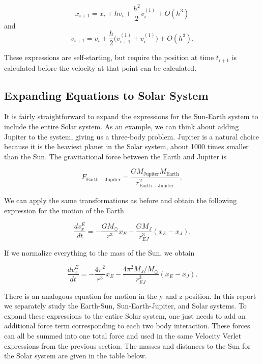 \documentclass[%
oneside,                 %
final,                   %
10pt]{article}
\begin{document}
\[
x_{i+1} =x_i +hv_i+\frac{h^2}{2}v_i^{(1)}+O(h^3)
\]
and
\[
v_{i+1} =v_i +\frac{h}{2} \big(v_{i+1}^{(1)}+v_i^{(1)} \big)+O(h^3).
\]

These expressions are self-starting, but require the position at time $t_{i+1}$ is calculated before the velocity at that point can be calculated.

\subsection{Expanding Equations to Solar System}

It is fairly straightforward to expand the expressions for the Sun-Earth system to include the entire Solar system.  As an example, we can think about adding Jupiter to the system, giving us a three-body problem.  Jupiter is a natural choice because it is the heaviest planet in the Solar system, about 1000 times smaller than the Sun.  The gravitational force between the Earth and Jupiter is

\[
F_{\mathrm{Earth-Jupiter}}=\frac{GM_{\mathrm{Jupiter}}M_{\mathrm{Earth}}}{r_{\mathrm{Earth-Jupiter}}^2},
\]

We can apply the same transformations as before and obtain the following expression for the motion of the Earth

\[
\frac{dv_x^E}{dt}=-\frac{G M_{\odot}}{r^3}x_E - \frac{G M_{J}}{r^3_{EJ}}(x_E-x_J).
\]

If we normalize everything to the mass of the Sun, we obtain

\[
\frac{dv_x^E}{dt}=-\frac{4 \pi^2}{r^3}x_E - \frac{4 \pi^2 M_J/M_{\odot}}{r^3_{EJ}}(x_E-x_J).
\]

There is an analogous equation for motion in the y and z position.  In this report we separately study the Earth-Sun, Sun-Earth-Jupiter, and Solar systems.  To expand these expressions to the entire Solar system, one just needs to add an additional force term corresponding to each two body interaction.  These forces can all be summed into one total force and used in the same Velocity Verlet expressions from the previous section.  The masses and distances to the Sun for the Solar system are given in the table below.
\end{document}

